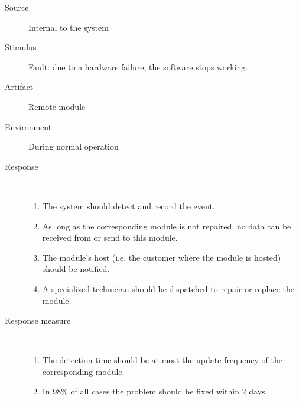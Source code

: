 \begin{description}
	\item[Source] Internal to the system
	\item[Stimulus] Fault: due to a hardware failure, the software stops working.
	\item[Artifact] Remote module 
	\item[Environment] During normal operation 
	\item[Response] \
	\begin{enumerate}
	  \item The system should detect and record the event.
	  \item As long as the corresponding module is not repaired, no data can
	  be received from or send to this module.
	  \item The module's host (i.e. the customer where the module is hosted) should
	  be notified.
	  \item A specialized technician should be dispatched to repair or replace the
	  module.
	\end{enumerate}
	\item[Response measure] \ 
	\begin{enumerate}
	  \item The detection time should be at most the update frequency of the
	  corresponding module.
	  \item In 98\% of all cases the problem should be fixed within 2 days.
	\end{enumerate}
\end{description}